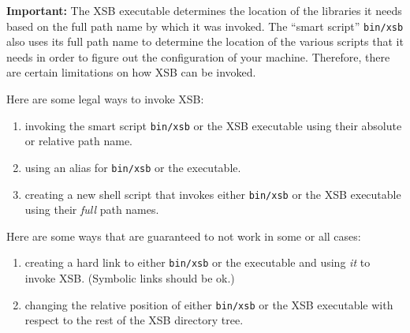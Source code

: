 {\bf Important:} The XSB executable determines the location of the
libraries it needs based on the full path name by which it was invoked.
The ``smart script'' \verb|bin/xsb| also uses its full path name to
determine the location of the various scripts that it needs in order to
figure out the configuration of your machine.  Therefore, there are certain
limitations on how XSB can be invoked.

Here are some legal ways to invoke XSB:
\begin{enumerate}
\item  invoking the smart script \verb|bin/xsb| or the XSB executable using
  their absolute or relative path name.
\item using an alias for \verb|bin/xsb| or the executable.
\item creating a new shell script that invokes either \verb|bin/xsb| or the
  XSB executable using their {\em full\/} path names. 
\end{enumerate}

Here are some ways that are guaranteed to not work in some or all cases:
\begin{enumerate}
\item  creating a hard link to either \verb|bin/xsb| or the executable and
  using {\it it\/} to invoke XSB. (Symbolic links should be ok.)
\item changing the relative position of either \verb|bin/xsb| or the
  XSB executable with respect to the rest of the XSB directory tree.
\end{enumerate}

